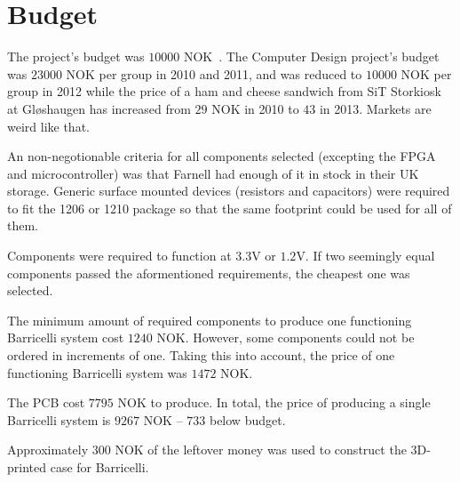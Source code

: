 \section{Budget}
The project's budget was $10 000$ NOK~\cite{assignment-text}.
The Computer Design project's budget was $23000$ NOK per group in 2010 and 2011, and was reduced to $10 000$ NOK per group in 2012\cite{} while the price of a ham and cheese sandwich from SiT Storkiosk at Gløshaugen has increased from $29$ NOK in 2010 to $43$ in 2013.
Markets are weird like that.

An non-negotionable criteria for all components selected (excepting the FPGA and microcontroller) was that Farnell had enough of it in stock in their UK storage.
Generic surface mounted devices (resistors and capacitors) were required to fit the 1206 or 1210 package so that the same footprint could be used for all of them.

Components were required to function at $3.3$V or $1.2$V.
If two seemingly equal components passed the aformentioned requirements, the cheapest one was selected.

The minimum amount of required components to produce one functioning Barricelli system cost $1240$ NOK.
However, some components could not be ordered in increments of one.
Taking this into account, the price of one functioning Barricelli system was $1472$ NOK.

The PCB cost $7795$ NOK to produce.
In total, the price of producing a single Barricelli system is $9267$ NOK -- $733$ below budget.

Approximately $300$ NOK of the leftover money was used to construct the 3D-printed case for Barricelli.


